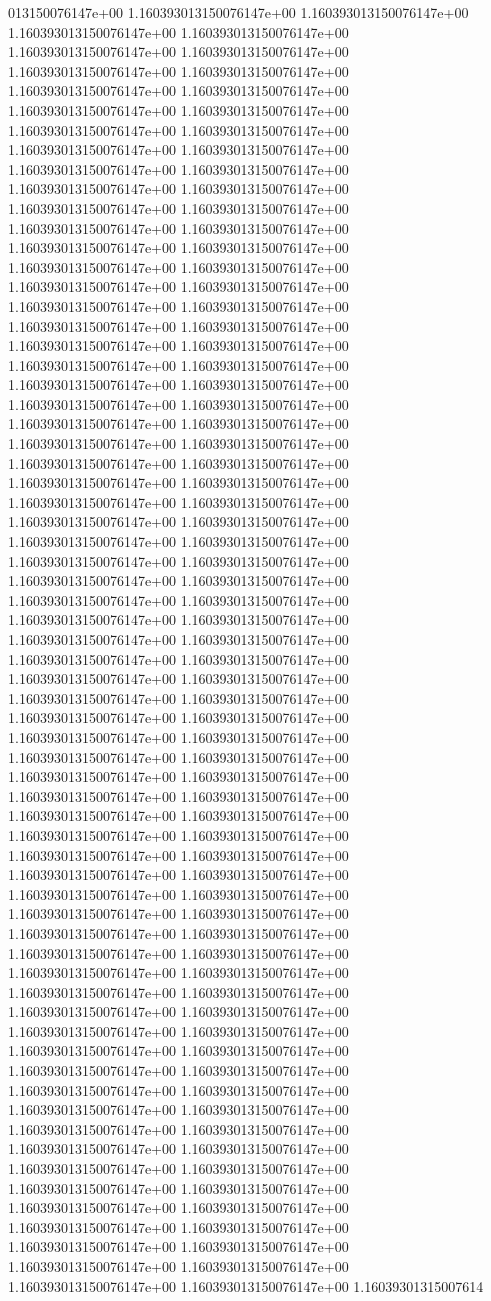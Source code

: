 013150076147e+00	1.160393013150076147e+00	1.160393013150076147e+00	1.160393013150076147e+00	1.160393013150076147e+00	1.160393013150076147e+00	1.160393013150076147e+00	1.160393013150076147e+00	1.160393013150076147e+00	1.160393013150076147e+00	1.160393013150076147e+00	1.160393013150076147e+00	1.160393013150076147e+00	1.160393013150076147e+00	1.160393013150076147e+00	1.160393013150076147e+00	1.160393013150076147e+00	1.160393013150076147e+00	1.160393013150076147e+00	1.160393013150076147e+00	1.160393013150076147e+00	1.160393013150076147e+00	1.160393013150076147e+00	1.160393013150076147e+00	1.160393013150076147e+00	1.160393013150076147e+00	1.160393013150076147e+00	1.160393013150076147e+00	1.160393013150076147e+00	1.160393013150076147e+00	1.160393013150076147e+00	1.160393013150076147e+00	1.160393013150076147e+00	1.160393013150076147e+00	1.160393013150076147e+00	1.160393013150076147e+00	1.160393013150076147e+00	1.160393013150076147e+00	1.160393013150076147e+00	1.160393013150076147e+00	1.160393013150076147e+00	1.160393013150076147e+00	1.160393013150076147e+00	1.160393013150076147e+00	1.160393013150076147e+00	1.160393013150076147e+00	1.160393013150076147e+00	1.160393013150076147e+00	1.160393013150076147e+00	1.160393013150076147e+00	1.160393013150076147e+00	1.160393013150076147e+00	1.160393013150076147e+00	1.160393013150076147e+00	1.160393013150076147e+00	1.160393013150076147e+00	1.160393013150076147e+00	1.160393013150076147e+00	1.160393013150076147e+00	1.160393013150076147e+00	1.160393013150076147e+00	1.160393013150076147e+00	1.160393013150076147e+00	1.160393013150076147e+00	1.160393013150076147e+00	1.160393013150076147e+00	1.160393013150076147e+00	1.160393013150076147e+00	1.160393013150076147e+00	1.160393013150076147e+00	1.160393013150076147e+00	1.160393013150076147e+00	1.160393013150076147e+00	1.160393013150076147e+00	1.160393013150076147e+00	1.160393013150076147e+00	1.160393013150076147e+00	1.160393013150076147e+00	1.160393013150076147e+00	1.160393013150076147e+00	1.160393013150076147e+00	1.160393013150076147e+00	1.160393013150076147e+00	1.160393013150076147e+00	1.160393013150076147e+00	1.160393013150076147e+00	1.160393013150076147e+00	1.160393013150076147e+00	1.160393013150076147e+00	1.160393013150076147e+00	1.160393013150076147e+00	1.160393013150076147e+00	1.160393013150076147e+00	1.160393013150076147e+00	1.160393013150076147e+00	1.160393013150076147e+00	1.160393013150076147e+00	1.160393013150076147e+00	1.160393013150076147e+00	1.160393013150076147e+00	1.160393013150076147e+00	1.160393013150076147e+00	1.160393013150076147e+00	1.160393013150076147e+00	1.160393013150076147e+00	1.160393013150076147e+00	1.160393013150076147e+00	1.160393013150076147e+00	1.160393013150076147e+00	1.160393013150076147e+00	1.160393013150076147e+00	1.160393013150076147e+00	1.160393013150076147e+00	1.160393013150076147e+00	1.160393013150076147e+00	1.160393013150076147e+00	1.160393013150076147e+00	1.160393013150076147e+00	1.160393013150076147e+00	1.160393013150076147e+00	1.160393013150076147e+00	1.160393013150076147e+00	1.160393013150076147e+00	1.160393013150076147e+00	1.160393013150076147e+00	1.160393013150076147e+00	1.160393013150076147e+00	1.160393013150076147e+00	1.160393013150076147e+00	1.160393013150076147e+00	1.160393013150076147e+00	1.160393013150076147e+00	1.160393013150076147e+00	1.16039301315007614